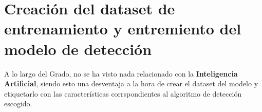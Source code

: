 \section{Creación del dataset de entrenamiento y entremiento del modelo de detección}
A lo largo del Grado, no se ha visto nada relacionado con la \textbf{Inteligencia Artificial}, siendo esto una desventaja a la hora de crear el dataset del modelo y etiquetarlo con las características corrspondientes al algoritmo de detección escogido.
